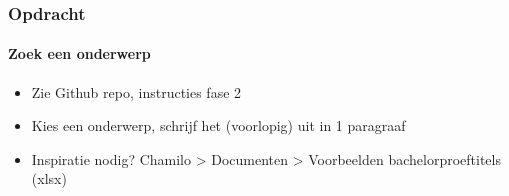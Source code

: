 \documentclass[aspectratio=169]{beamer}
\begin{document}
\begin{frame}
  \frametitle{Opdracht}
  \framesubtitle{Zoek een onderwerp}

  \begin{itemize}
    \item Zie Github repo, instructies fase 2
    \item Kies een onderwerp, schrijf het (voorlopig) uit in 1 paragraaf
    \item Inspiratie nodig? Chamilo > Documenten > Voorbeelden bachelorproeftitels (xlsx)
  \end{itemize}

\end{frame}
\end{document}
